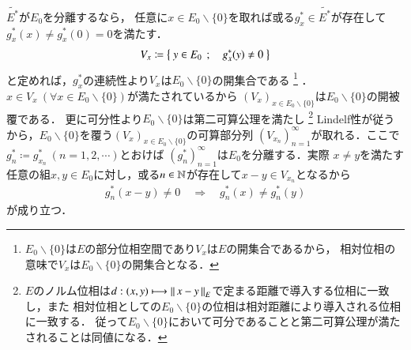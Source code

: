 	\begin{prf}
		$\tilde{E^*}$が$E_0$を分離するなら，
		任意に$x \in E_0 \backslash \{0\}$を取れば或る$g^*_x \in \tilde{E^*}$が存在して
		$g^*_x(x) \neq g^*_x(0) = 0$を満たす．
		\begin{align}
			V_x \coloneqq \left\{\ y \in E_0\ \, ; \quad g^*_x(y) \neq 0\ \right\}
		\end{align}
		と定めれば，$g^*_x$の連続性より$V_x$は$E_0 \backslash \{0\}$の開集合である
		\footnote{
			$E_0 \backslash \{0\}$は$E$の部分位相空間であり$V_x$は$E$の開集合であるから，
			相対位相の意味で$V_x$は$E_0 \backslash \{0\}$の開集合となる．
		}
		．$x \in V_x\ (\forall x \in E_0 \backslash \{0\})$が満たされているから
		$\left( V_x \right)_{x \in E_0 \backslash \{0\}}$は$E_0 \backslash \{0\}$の開被覆である．
		更に可分性より$E_0 \backslash \{0\}$は第二可算公理を満たし
		\footnote{
			$E$のノルム位相は$d:(x,y) \longmapsto \left\|\, x-y\, \right\|_{E}$で定まる距離で導入する位相に一致し，また
			相対位相としての$E_0 \backslash \{0\}$の位相は相対距離により導入される位相に一致する．
			従って$E_0 \backslash \{0\}$において可分であることと第二可算公理が満たされることは同値になる．
		}
		Lindelf性が従うから，$E_0 \backslash \{0\}$を覆う$\left( V_x \right)_{x \in E_0 \backslash \{0\}}$の可算部分列
		$\left( V_{x_n} \right)_{n=1}^{\infty}$が取れる．ここで$g^*_n \coloneqq g^*_{x_n}\ (n=1,2,\cdots)$とおけば
		$\left( g^*_n \right)_{n=1}^{\infty}$は$E_0$を分離する．実際
		$x \neq y$を満たす任意の組$x,y \in E_0$に対し，或る$n \in \mathbb{N}$が存在して$x - y \in V_{x_n}$となるから
		\begin{align}
			g^*_n(x - y) \neq 0 \quad \Rightarrow \quad g^*_n(x) \neq g^*_n(y)
		\end{align}
		が成り立つ．
		\QED
	\end{prf}
	